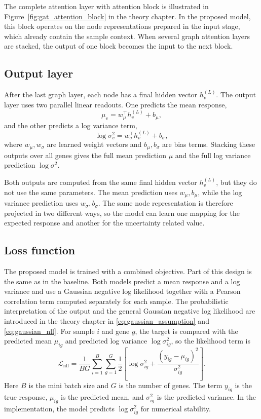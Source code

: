 \noindent The complete attention layer with attention block is illustrated in Figure~\ref{fig:gat_attention_block} in the theory chapter. In the proposed model, this block operates on the node representations prepared in the input stage, which already contain the sample context. When several graph attention layers are stacked, the output of one block becomes the input to the next block.

\subsection{Output layer}
\noindent After the last graph layer, each node has a final hidden vector $h_{v}^{(L)}$. The output layer uses two parallel linear readouts. One predicts the mean response,
\begin{equation}
\mu_{v}=w_{\mu}^{\top} h_{v}^{(L)} + b_{\mu},
\end{equation}
and the other predicts a log variance term,
\begin{equation}
\log \sigma_{v}^{2}=w_{\sigma}^{\top} h_{v}^{(L)} + b_{\sigma},
\end{equation}
where $w_{\mu}, w_{\sigma}$ are learned weight vectors and $b_{\mu}, b_{\sigma}$ are bias terms. Stacking these outputs over all genes gives the full mean prediction $\mu$ and the full log variance prediction $\log \sigma^{2}$.

\noindent Both outputs are computed from the same final hidden vector $h_{v}^{(L)}$, but they do not use the same parameters. The mean prediction uses $w_{\mu}, b_{\mu}$, while the log variance prediction uses $w_{\sigma}, b_{\sigma}$. The same node representation is therefore projected in two different ways, so the model can learn one mapping for the expected response and another for the uncertainty related value.


\subsection{Loss function}
\noindent The proposed model is trained with a combined objective. Part of this design is the same as in the baseline. Both models predict a mean response and a log variance and use a Gaussian negative log likelihood together with a Pearson correlation term computed separately for each sample. The probabilistic interpretation of the output and the general Gaussian negative log likelihood are introduced in the theory chapter in \eqref{eq:gaussian_assumption} and \eqref{eq:gaussian_nll}. For sample $i$ and gene $g$, the target is compared with the predicted mean $\mu_{ig}$ and predicted log variance $\log \sigma_{ig}^{2}$, so the likelihood term is
\begin{equation}
\mathcal{L}_{\mathrm{nll}}=\frac{1}{BG}\sum_{i=1}^{B}\sum_{g=1}^{G}\frac{1}{2}\left[\log \sigma_{ig}^{2}+\frac{(y_{ig}-\mu_{ig})^{2}}{\sigma_{ig}^{2}}\right].
\end{equation}
Here $B$ is the mini batch size and $G$ is the number of genes. The term $y_{ig}$ is the true response, $\mu_{ig}$ is the predicted mean, and $\sigma_{ig}^{2}$ is the predicted variance. In the implementation, the model predicts $\log \sigma_{ig}^{2}$ for numerical stability.

